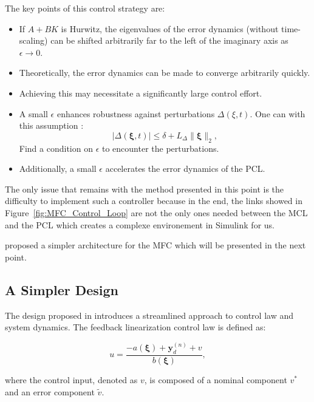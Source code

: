 The key points of this control strategy are:

    \begin{itemize}
    \item If \( A + BK \) is Hurwitz, the eigenvalues of the error dynamics (without time-scaling) can 
    be shifted arbitrarily far to the left of the imaginary axis as \( \epsilon \rightarrow 0 \).
    \item Theoretically, the error dynamics can be made to converge arbitrarily quickly.
    \item Achieving this may necessitate a significantly large control effort.
    \item A small \( \epsilon \) enhances robustness against perturbations \( \Delta(\xi, t) \). 
    One can with this assumption : 
    \begin{equation}
        |\Delta(\boldsymbol{\xi}, t)| \leq \delta + L_\Delta \lVert \boldsymbol{\xi} \rVert_2,
        \label{eq:perturbation_boundPCL}
    \end{equation}
    Find a condition on \(\epsilon\) to encounter the perturbations.
    \item Additionally, a small \( \epsilon \) accelerates the error dynamics of the PCL.
\end{itemize}

The only issue that remains with the method presented in this point is the difficulty to implement such a controller
because in the end, the links showed in Figure~\ref{fig:MFC_Control_Loop} are not the only ones
needed between the MCL and the PCL which creates a complexe environement in Simulink for us. 

\cite{Tietze2023CruiseControl} proposed a simpler architecture for the MFC which will be presented in the 
next point.


\subsection{A Simpler Design}

The design proposed in \cite{Tietze2023CruiseControl} introduces a streamlined approach to control law and 
system dynamics. The feedback linearization control law is defined as:

\begin{equation}
    u = \frac{-a(\boldsymbol{\xi}) + \boldsymbol{y}_d^{(n)} + v}{b(\boldsymbol{\xi})},
\end{equation}

where the control input, denoted as \(v\), is composed of a nominal component \(v^*\) and an error 
component \(\tilde{v}\).

